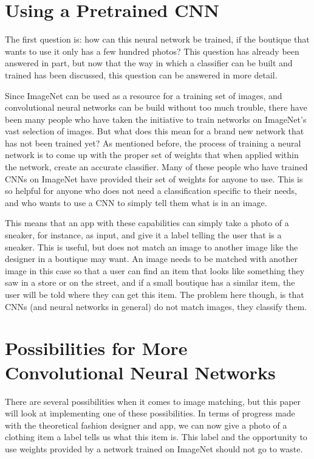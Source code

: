 \documentclass[12pt]{report} %
\begin{document}
\section{Using a Pretrained CNN}
	The first question is: how can this neural network be trained, if the boutique that wants to use it only has a few hundred photos? This question has already been answered in part, but now that the way in which a classifier can be built and trained has been discussed, this question can be answered in more detail. 
	
	Since ImageNet can be used as a resource for a training set of images, and convolutional neural networks can be build without too much trouble, there have been many people who have taken the initiative to train networks on ImageNet's vast selection of images. But what does this mean for a brand new network that has not been trained yet? As mentioned before, the process of training a neural network is to come up with the proper set of weights that when applied within the network, create an accurate classifier. Many of these people who have trained CNNs on ImageNet have provided their set of weights for anyone to use. This is so helpful for anyone who does not need a classification specific to their needs, and who wants to use a CNN to simply tell them what is in an image. 
	
	This means that an app with these capabilities can simply take a photo of a sneaker, for instance, as input, and give it a label telling the user that is a sneaker. This is useful, but does not match an image to another image like the designer in a boutique may want. An image needs to be matched with another image in this case so that a user can find an item that looks like something they saw in a store or on the street, and if a small boutique has a similar item, the user will be told where they can get this item. The problem here though, is that CNNs (and neural networks in general) do not match images, they classify them. 

\section{Possibilities for More Convolutional Neural Networks}
	There are several possibilities when it comes to image matching, but this paper will look at implementing one of these possibilities. In terms of progress made with the theoretical fashion designer and app, we can now give a photo of a clothing item a label tells us what this item is. This label and the opportunity to use weights provided by a network trained on ImageNet should not go to waste.
	
\end{document}
